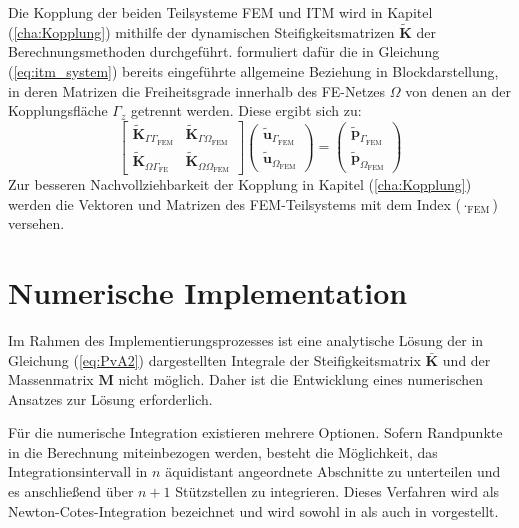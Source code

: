 Die Kopplung der beiden Teilsysteme FEM und ITM wird in Kapitel (\ref{cha:Kopplung}) mithilfe der dynamischen Steifigkeitsmatrizen $\tilde{\mathbf K}$ der Berechnungsmethoden durchgeführt. 
\cite{Hackenberg2016} formuliert dafür die in Gleichung (\ref{eq:itm_system}) bereits eingeführte allgemeine Beziehung in Blockdarstellung, in deren Matrizen die Freiheitsgrade innerhalb des FE-Netzes $\Omega$ von denen an der Kopplungsfläche $\Gamma_z$ getrennt werden. Diese ergibt sich zu:
\begin{equation}\label{eq:fe_block_system}
	\begin{bmatrix}
		\tilde{\mathbf K}_{\Gamma\Gamma_{\mathrm{FEM}}} & \tilde{\mathbf K}_{\Gamma\Omega_{\mathrm{FEM}}} \\[6pt]
		\tilde{\mathbf K}_{\Omega\Gamma_{\mathrm{FE}}} & \tilde{\mathbf K}_{\Omega\Omega_{\mathrm{FEM}}}
	\end{bmatrix}
	\begin{pmatrix}
		\tilde{\mathbf u}_{\Gamma_{\mathrm{FEM}}} \\[2pt]
		\tilde{\mathbf u}_{\Omega_{\mathrm{FEM}}}
	\end{pmatrix}
	=
	\begin{pmatrix}
		\tilde{\mathbf p}_{\Gamma_{\mathrm{FEM}}} \\[2pt]
		\tilde{\mathbf p}_{\Omega_{\mathrm{FEM}}}
	\end{pmatrix}
\end{equation}
Zur besseren Nachvollziehbarkeit der Kopplung in Kapitel (\ref{cha:Kopplung}) werden die Vektoren und Matrizen des FEM-Teilsystems mit dem Index ($\cdot_{\mathrm{FEM}}$) versehen.



\section{Numerische Implementation}
\label{sec:Numerik}

Im Rahmen des Implementierungsprozesses ist eine analytische Lösung der in Gleichung (\ref{eq:PvA2}) dargestellten Integrale der Steifigkeitsmatrix \(\bar{\mathbf{K}}\) und der Massenmatrix \(\mathbf M\) nicht möglich.
Daher ist die Entwicklung eines numerischen Ansatzes zur Lösung erforderlich.

Für die numerische Integration existieren mehrere Optionen. 
Sofern Randpunkte in die Berechnung miteinbezogen werden, besteht die Möglichkeit, das Integrationsintervall in $n$ äquidistant angeordnete Abschnitte zu unterteilen und es anschließend über $n+1$ Stützstellen zu integrieren. Dieses Verfahren wird als Newton-Cotes-Integration bezeichnet und wird sowohl in \cite{Klein2003} als auch in \cite{Gross2023} vorgestellt.

